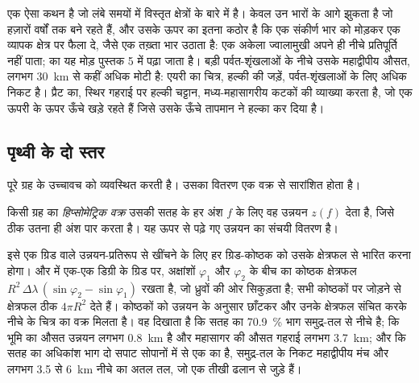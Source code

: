  एक ऐसा कथन है जो लंबे समयों में विस्तृत क्षेत्रों के बारे में है।  केवल उन भारों के आगे झुकता है जो हज़ारों वर्षों तक बने रहते हैं, और उसके ऊपर का  इतना कठोर है कि एक संकीर्ण भार को मोड़कर एक व्यापक क्षेत्र पर फैला दे, जैसे एक तख़्ता भार उठाता है: एक अकेला ज्वालामुखी अपने ही नीचे प्रतिपूर्ति नहीं पाता;  का यह मोड़ पुस्तक 5 में पढ़ा जाता है। बड़ी पर्वत-शृंखलाओं के नीचे  उसके महाद्वीपीय औसत, लगभग \qty{30}{km} से कहीं अधिक मोटी है: एयरी का चित्र, हल्की  की जड़ें, पर्वत-शृंखलाओं के लिए अधिक निकट है। प्रैट का, स्थिर गहराई पर हल्की चट्टान, मध्य-महासागरीय कटकों की व्याख्या करता है, जो एक ऊपरी  के ऊपर ऊँचे खड़े रहते हैं जिसे उसके ऊँचे तापमान ने हल्का कर दिया है।

\subsection*{पृथ्वी के दो स्तर}

 पूरे ग्रह के उच्चावच को व्यवस्थित करती है। उसका वितरण एक वक्र से सारांशित होता है।

\begin{definition}[हिप्सोमेट्रिक वक्र]\label{def:b1:isostasy-gravity:hypsometry}
किसी ग्रह का \emph{हिप्सोमेट्रिक वक्र} उसकी सतह के हर अंश $f$ के लिए वह उन्नयन $z(f)$ देता है, जिसे ठीक उतना ही अंश पार करता है। यह ऊपर से पढ़े गए उन्नयन का संचयी वितरण है।
\end{definition}

इसे एक ग्रिड वाले उन्नयन-प्रतिरूप से खींचने के लिए हर ग्रिड-कोष्ठक को उसके क्षेत्रफल से भारित करना होगा।  और  में एक-एक डिग्री के ग्रिड पर, अक्षांशों $\varphi_1$ और $\varphi_2$ के बीच का कोष्ठक क्षेत्रफल $R^2\,\Delta\lambda\,(\sin\varphi_2 - \sin\varphi_1)$ रखता है, जो ध्रुवों की ओर सिकुड़ता है; सभी कोष्ठकों पर जोड़ने से क्षेत्रफल ठीक $4\pi R^2$ देते हैं। कोष्ठकों को उन्नयन के अनुसार छाँटकर और उनके क्षेत्रफल संचित करके नीचे के चित्र का वक्र मिलता है। वह दिखाता है कि सतह का \qty{70.9}{\percent} भाग समुद्र-तल से नीचे है; कि भूमि का औसत उन्नयन लगभग \qty{0.8}{km} है और महासागर की औसत गहराई लगभग \qty{3.7}{km}; और कि सतह का अधिकांश भाग दो सपाट सोपानों में से एक का है, समुद्र-तल के निकट महाद्वीपीय मंच और लगभग 3.5 से \qty{6}{km} नीचे का अतल तल, जो एक तीखी ढलान से जुड़े हैं।

